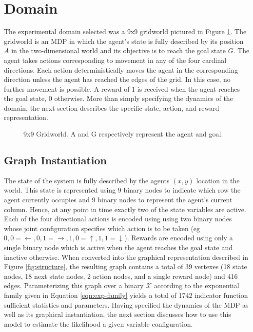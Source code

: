 \documentclass{article} %
\begin{document}
\section{Domain}
The experimental domain selected was a 9x9 gridworld pictured in Figure \ref{fig:gridworld}. The gridworld is an MDP in which the agent's state is fully described by its position $A$ in the two-dimensional world and its objective is to reach the goal state $G$. The agent takes actions corresponding to movement in any of the four cardinal directions. Each action deterministically moves the agent in the corresponding direction unless the agent has reached the edges of the grid. In this case, no further movement is possible. A reward of 1 is received when the agent reaches the goal state, 0 otherwise. More than simply specifying the dynamics of the domain, the next section describes the specific state, action, and reward representation.

\begin{figure}
\center
{}
\caption{9x9 Gridworld. A and G respectively represent the agent and goal.}
\label{fig:gridworld}
\end{figure}

\subsection{Graph Instantiation}
The state of the system is fully described by the agents $(x,y)$ location in the world. This state is represented using 9 binary nodes to indicate which row the agent currently occupies and 9 binary nodes to represent the agent's current column. Hence, at any point in time exactly two of the state variables are active. Each of the four directional actions is encoded using using two binary nodes whose joint configuration specifies which action is to be taken (eg $0,0=\leftarrow, 0,1=\rightarrow, 1,0=\uparrow, 1,1=\downarrow$). Rewards are encoded using only a single binary node which is active when the agent reaches the goal state and inactive otherwise. When converted into the graphical representation described in Figure \ref{fig:structure}, the resulting graph contains a total of 39 vertexes (18 state nodes, 18 next state nodes, 2 action nodes, and a single reward node) and 416 edges. Parameterizing this graph over a binary $\mathcal{X}$ according to the exponential family given in Equation \ref{eqn:exp-family} yields a total of 1742 indicator function sufficient statistics and parameters. Having specified the dynamics of the MDP as well as its graphical instantiation, the next section discusses how to use this model to estimate the likelihood a given variable configuration.
\end{document}
